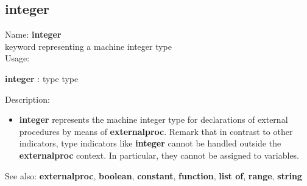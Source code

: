 \subsection{ integer }
\noindent Name: \textbf{integer}\\
keyword representing a machine integer type \\

\noindent Usage: 
\begin{center}
\textbf{integer} : \textsf{type type}\\
\end{center}
\noindent Description: \begin{itemize}

\item \textbf{integer} represents the machine integer type for declarations
   of external procedures by means of \textbf{externalproc}.
   Remark that in contrast to other indicators, type indicators like
   \textbf{integer} cannot be handled outside the \textbf{externalproc} context.  In
   particular, they cannot be assigned to variables.
\end{itemize}
See also: \textbf{externalproc}, \textbf{boolean}, \textbf{constant}, \textbf{function}, \textbf{list of}, \textbf{range}, \textbf{string}
